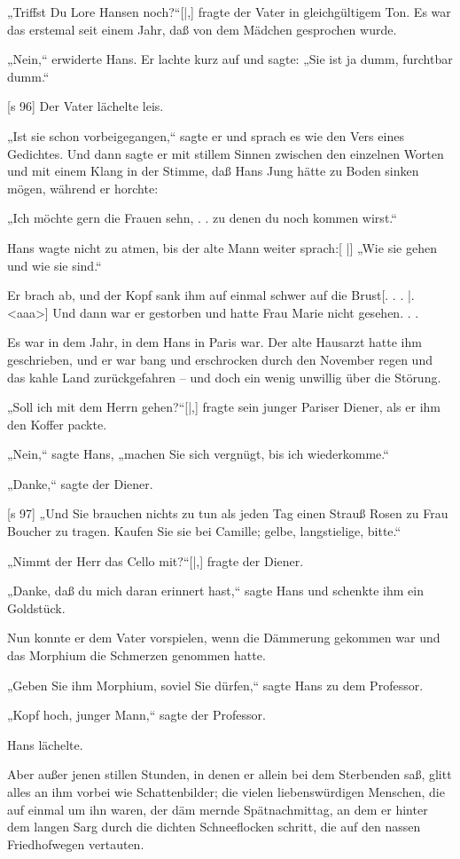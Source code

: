 „Triffst Du Lore Hansen noch?“[|,] fragte der Vater
in gleichgültigem Ton. Es war das erstemal seit
einem Jahr, daß von dem Mädchen gesprochen wurde.

„Nein,“ erwiderte Hans. Er lachte kurz auf
und sagte: „Sie ist ja dumm, furchtbar dumm.“

[s 96]
Der Vater lächelte leis.

„Ist sie schon vorbeigegangen,“ sagte er und
sprach es wie den Vers eines Gedichtes. Und dann
sagte er mit stillem Sinnen zwischen den einzelnen
Worten und mit einem Klang in der Stimme, daß
Hans Jung hätte zu Boden sinken mögen, während
er horchte:

„Ich möchte gern die Frauen sehn, . . zu denen
du noch kommen wirst.“

Hans wagte nicht zu atmen, bis der alte Mann
weiter sprach:[
|]
„Wie sie gehen und wie sie sind.“

Er brach ab, und der Kopf sank ihm auf einmal
schwer auf die Brust[. . .
|.
<aaa>]
Und dann war er gestorben und hatte Frau
Marie nicht gesehen. . .

Es war in dem Jahr, in dem Hans in Paris
war. Der alte Haus­arzt hatte ihm geschrieben, und
er war bang und erschrocken durch den November­
regen und das kah­le Land zu­rück­ge­fah­ren – und
doch ein wenig unwillig über die Störung.

„Soll ich mit dem Herrn gehen?“[|,] fragte sein
junger Pariser Diener, als er ihm den Koffer packte.

„Nein,“ sagte Hans, „machen Sie sich vergnügt,
bis ich wiederkomme.“

„Danke,“ sagte der Diener.

[s 97]
„Und Sie brauchen nichts zu tun als jeden Tag
einen Strauß Rosen zu Frau Boucher zu tragen.
Kaufen Sie sie bei Camille; gelbe, langstielige, bitte.“

„Nimmt der Herr das Cello mit?“[|,] fragte der
Diener.

„Danke, daß du mich daran erinnert hast,“
sagte Hans und schenkte ihm ein Goldstück.

Nun konnte er dem Vater vorspielen, wenn die
Dämmerung gekommen war und das Morphium die
Schmerzen genommen hatte.

„Geben Sie ihm Morphium, soviel Sie dürfen,“
sagte Hans zu dem Professor.

„Kopf hoch, junger Mann,“ sagte der Professor.

Hans lächelte.

Aber außer jenen stillen Stunden, in denen er
allein bei dem Sterbenden saß, glitt alles an ihm
vorbei wie Schattenbilder; die vielen liebenswürdigen
Menschen, die auf einmal um ihn waren, der däm­
mernde Spätnachmittag, an dem er hinter dem langen
Sarg durch die dichten Schneeflocken schritt, die auf
den nassen Friedhofwegen vertauten.


